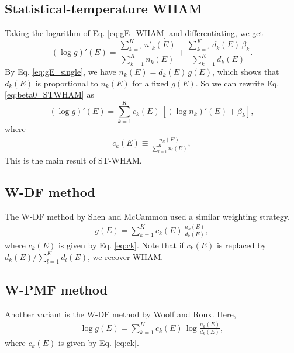 \documentclass[aip,jcp,preprint,notitlepage, superscriptaddress]{revtex4-1}
\begin{document}
\subsection{Statistical-temperature WHAM}



Taking the logarithm of Eq. \eqref{eq:gE_WHAM} and differentiating,
we get
\begin{equation}
(\log g)'(E)
=
\frac{ \sum_{k = 1}^K n'_k(E) }
     { \sum_{k = 1}^K n_k(E) }
+
\frac{ \sum_{k = 1}^K d_k(E) \, \beta_k }
     { \sum_{k = 1}^K d_k(E) }.
\label{eq:beta0_STWHAM}
\end{equation}
%
By Eq. \eqref{eq:gE_single},
we have
$n_k(E) = d_k(E) \, g(E)$,
which shows that
$d_k(E)$
is proportional to $n_k(E)$
for a fixed $g(E)$.
%
So we can rewrite Eq. \eqref{eq:beta0_STWHAM} as
%
\begin{equation}
(\log g)'(E)
=
\sum_{k = 1}^K c_k(E) \, \left[ (\log n_k)'(E)  + \beta_k \right],
\label{eq:beta_STWHAM}
\end{equation}
%
where
\begin{align}
  c_k(E) \equiv \frac{ n_k(E)  }{ \sum_{l = 1}^{K} n_l(E) },
  \label{eq:ck}
\end{align}
%
This is the main result of ST-WHAM.





\subsection{W-DF method}



The W-DF method by Shen and McCammon\cite{
shen1991, roux1995}
used a similar weighting strategy.
%
\begin{align}
g(E) = \sum_{k = 1}^K c_k(E) \, \frac{ n_k(E) } { d_k(E) },
\end{align}
%
where $c_k(E)$ is given by Eq. \eqref{eq:ck}.
%
Note that
if $c_k(E)$
is replaced by $ d_k(E) / \sum_{l = 1}^K d_l(E)$,
we recover WHAM.



\subsection{W-PMF method}



Another variant is the W-DF method by Woolf and Roux\cite{
woolf1994, crouzy1994, roux1995}.
%
Here,
%
\begin{align}
\log g(E) = \sum_{k = 1}^K c_k(E) \, \log \frac{ n_k(E) } { d_k(E) },
\end{align}
%
where $c_k(E)$ is given by Eq. \eqref{eq:ck}.
%
\end{document}

